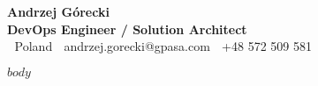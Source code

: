 \documentclass[a4paper,10pt]{article}
\begin{document}
\begin{center}
    {\Huge \textbf{Andrzej Górecki}} \\
    \vspace{0.2cm}
    \textbf{DevOps Engineer / Solution Architect} \\
    \vspace{0.1cm}
    \emoji 📍 Poland \quad \emoji 📧 andrzej.gorecki@gpasa.com \quad \emoji 📱 +48 572 509 581 \\
    
\end{center}

\vspace{0.5cm}

$body$
\end{document}
